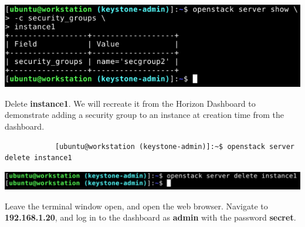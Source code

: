 \documentclass[letterpaper, 12pt]{article}
\begin{document}
\begin{enumerate}
\begin{labstep}
        \begin{center}
            \includegraphics[width=\linewidth]{images/part2/step7.png}
        \end{center}
    \end{labstep}

    \begin{labstep}
        Delete \textbf{instance1}.
        We will recreate it from the Horizon Dashboard to demonstrate adding a security group to an instance at creation time from the dashboard.
        \begin{lstlisting}
            [ubuntu@workstation (keystone-admin)]:~$ openstack server delete instance1
        \end{lstlisting}

        \begin{center}
            \includegraphics[width=\linewidth]{images/part2/step8.png}
        \end{center}
    \end{labstep}

    \begin{labstep}
        Leave the terminal window open, and open the web browser.
        Navigate to \textbf{192.168.1.20}, and log in to the dashboard as \textbf{admin} with the password \textbf{secret}.


\end{labstep}
\end{enumerate}
\end{document}
